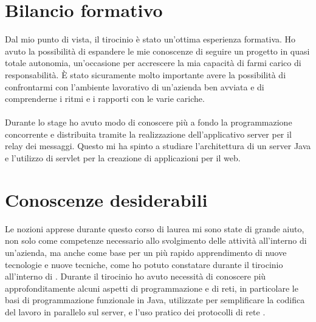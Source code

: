 \section{Bilancio formativo}
Dal mio punto di vista, il tirocinio è stato un'ottima esperienza formativa. Ho avuto la possibilità di espandere le mie conoscenze di seguire un progetto in quasi totale autonomia, un'occasione per accrescere la mia capacità di farmi carico di responsabilità. È stato sicuramente molto importante avere la possibilità di confrontarmi con l'ambiente lavorativo di un'azienda ben avviata e di comprenderne i ritmi e i rapporti con le varie cariche.
\paragraph*{}
Durante lo stage ho avuto modo di conoscere più a fondo la programmazione concorrente e distribuita tramite la realizzazione dell'applicativo server per il relay dei messaggi. Questo mi ha spinto a studiare l'architettura di un server Java e l'utilizzo di servlet per la creazione di applicazioni per il web.

\section{Conoscenze desiderabili}
Le nozioni apprese durante questo corso di laurea mi sono state di grande aiuto, non solo come competenze necessario allo svolgimento delle attività all'interno di un'azienda, ma anche come base per un più rapido apprendimento di nuove tecnologie e nuove tecniche, come ho potuto constatare durante il tirocinio all'interno di \nomeAzienda{}. Durante il tirocinio ho avuto necessità di conoscere più approfonditamente alcuni aspetti di programmazione e di reti, in particolare le basi di programmazione funzionale in Java, utilizzate per semplificare la codifica del lavoro in parallelo sul server, e l'uso pratico dei protocolli di rete .
